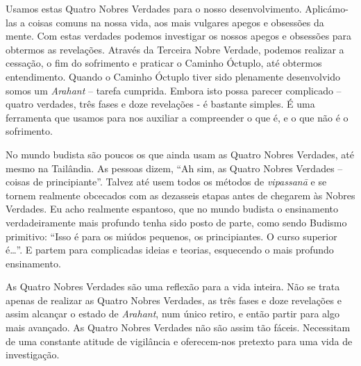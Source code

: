Usamos estas Quatro Nobres Verdades para o nosso desenvolvimento. Aplicámo-las a
coisas comuns na nossa vida, aos mais vulgares apegos e obsessões da mente. Com
estas verdades podemos investigar os nossos apegos e obsessões para obtermos as
revelações. Através da Terceira Nobre Verdade, podemos realizar a cessação, o
fim do sofrimento e praticar o Caminho Óctuplo, até obtermos entendimento.
Quando o Caminho Óctuplo tiver sido plenamente desenvolvido somos um
\emph{Arahant} – tarefa cumprida. Embora isto possa parecer complicado – quatro
verdades, três fases e doze revelações - é bastante simples. É uma ferramenta
que usamos para nos auxiliar a compreender o que é, e o que não é o sofrimento.

No mundo budista são poucos os que ainda usam as Quatro Nobres Verdades, até
mesmo na Tailândia. As pessoas dizem, “Ah sim, as Quatro Nobres Verdades –
coisas de principiante”. Talvez até usem todos os métodos de \emph{vipassanā} e
se tornem realmente obcecados com as dezasseis etapas antes de chegarem às
Nobres Verdades. Eu acho realmente espantoso, que no mundo budista o ensinamento
verdadeiramente mais profundo tenha sido posto de parte, como sendo Budismo
primitivo: “Isso é para os miúdos pequenos, os principiantes. O curso superior
é\ldots{}”. E partem para complicadas ideias e teorias, esquecendo o mais
profundo ensinamento.

As Quatro Nobres Verdades são uma reflexão para a vida inteira. Não se trata
apenas de realizar as Quatro Nobres Verdades, as três fases e doze revelações e
assim alcançar o estado de \emph{Arahant}, num único retiro, e então partir para
algo mais avançado. As Quatro Nobres Verdades não são assim tão fáceis.
Necessitam de uma constante atitude de vigilância e oferecem-nos pretexto para
uma vida de investigação.

